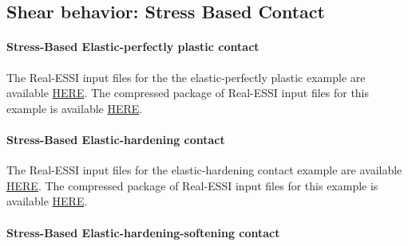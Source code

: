\clearpage
\newpage
\subsection{ Shear behavior: Stress Based Contact }


\paragraph{Stress-Based Elastic-perfectly plastic contact}
The Real-ESSI input files for the the elastic-perfectly plastic example are available 
\href{http://sokocalo.engr.ucdavis.edu/~jeremic/lecture_notes_online_material/_Chapter_Short_Course_Examples/short-course-examples/Day3/Contact_Examples/shear/SoftContact_Elastic_Perfectly_Plastic_Shear_Model}{HERE}. 
The compressed package of Real-ESSI input files for this example is available 
\href{http://sokocalo.engr.ucdavis.edu/~jeremic/lecture_notes_online_material/_Chapter_Short_Course_Examples/short-course-examples/Day3/Contact_Examples/shear/SoftContact_Elastic_Perfectly_Plastic_Shear_Model/_all_files_packaged_for_SoftContact_Elastic_Perfectly_Plastic_Shear_Model.tar.gz}{HERE}. 


\paragraph{Stress-Based Elastic-hardening contact}

The Real-ESSI input files for the elastic-hardening contact example are available 
\href{http://sokocalo.engr.ucdavis.edu/~jeremic/lecture_notes_online_material/_Chapter_Short_Course_Examples/short-course-examples/Day3/Contact_Examples/shear/SoftContact_Nonlinear_Hardening_Shear_Model}{HERE}. 
The compressed package of Real-ESSI input files for this example is available 
\href{http://sokocalo.engr.ucdavis.edu/~jeremic/lecture_notes_online_material/_Chapter_Short_Course_Examples/short-course-examples/Day3/Contact_Examples/shear/SoftContact_Nonlinear_Hardening_Shear_Model/_all_files_packaged_for_SoftContact_Nonlinear_Hardening_Shear_Model.tar.gz}{HERE}. 



\paragraph{Stress-Based Elastic-hardening-softening contact}

